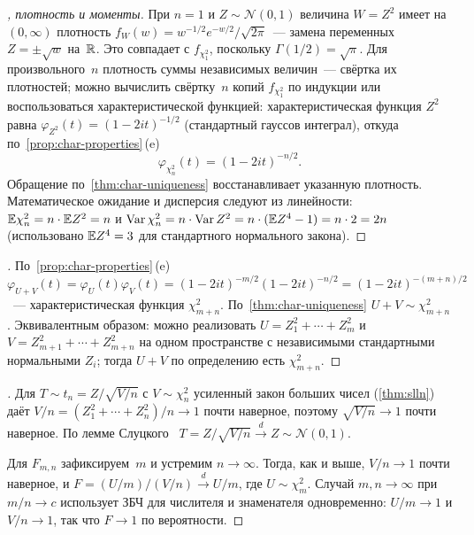 \begin{proof}[, плотность и моменты]
При $n = 1$ и $Z \sim \mathcal{N}(0, 1)$ величина $W = Z^2$ имеет на $(0, \infty)$ плотность $f_W(w) = w^{-1/2} e^{-w/2}/\sqrt{2 \pi}$~--- замена переменных $Z = \pm \sqrt w$ на~$\mathbb{R}$. Это совпадает с $f_{\chi^2_1}$, поскольку $\Gamma(1/2) = \sqrt \pi$. Для произвольного~$n$ плотность суммы независимых величин~--- свёртка их плотностей; можно вычислить свёртку~$n$ копий $f_{\chi^2_1}$ по индукции или воспользоваться характеристической функцией: характеристическая функция $Z^2$ равна $\varphi_{Z^2}(t) = (1 - 2it)^{-1/2}$ (стандартный гауссов интеграл), откуда по~\cref{prop:char-properties}\,(e)
\[
  \varphi_{\chi^2_n}(t) = (1 - 2it)^{-n/2}.
\]
Обращение по~\cref{thm:char-uniqueness} восстанавливает указанную плотность. Математическое ожидание и дисперсия следуют из линейности: $\mathbb{E} \chi^2_n = n \cdot \mathbb{E} Z^2 = n$ и $\operatorname{Var} \chi^2_n = n \cdot \operatorname{Var} Z^2 = n \cdot (\mathbb{E} Z^4 - 1) = n \cdot 2 = 2n$ (использовано $\mathbb{E} Z^4 = 3$ для стандартного нормального закона).
\end{proof}

\begin{proof}[]
По~\cref{prop:char-properties}\,(e) $\varphi_{U + V}(t) = \varphi_U(t) \varphi_V(t) = (1 - 2it)^{-m/2} (1 - 2it)^{-n/2} = (1 - 2it)^{-(m+n)/2}$~--- характеристическая функция $\chi^2_{m+n}$. По~\cref{thm:char-uniqueness} $U + V \sim \chi^2_{m+n}$. Эквивалентным образом: можно реализовать $U = Z_1^2 + \cdots + Z_m^2$ и $V = Z_{m+1}^2 + \cdots + Z_{m+n}^2$ на одном пространстве с независимыми стандартными нормальными $Z_i$; тогда $U + V$ по определению есть $\chi^2_{m+n}$.
\end{proof}

\begin{proof}[]
Для $T \sim t_n = Z / \sqrt{V/n}$ с $V \sim \chi^2_n$ усиленный закон больших чисел (\cref{thm:slln}) даёт $V/n = (Z_1^2 + \cdots + Z_n^2)/n \to 1$ почти наверное, поэтому $\sqrt{V/n} \to 1$ почти наверное. По лемме Слуцкого~\cite[гл.~III, \S~1]{Shiryaev1989} $T = Z / \sqrt{V/n} \xrightarrow{d} Z \sim \mathcal{N}(0, 1)$.

Для $F_{m, n}$ зафиксируем~$m$ и устремим $n \to \infty$. Тогда, как и выше, $V/n \to 1$ почти наверное, и $F = (U/m) / (V/n) \xrightarrow{d} U/m$, где $U \sim \chi^2_m$. Случай $m, n \to \infty$ при $m/n \to c$ использует ЗБЧ для числителя и знаменателя одновременно: $U/m \to 1$ и $V/n \to 1$, так что $F \to 1$ по вероятности.
\end{proof}

